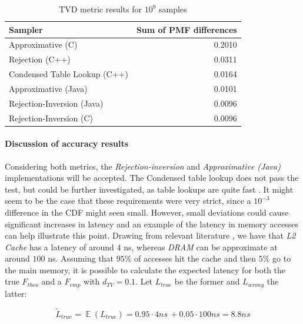\begin{table}[hbt]
    \centering
    \begin{tabular}{|l|r|}
        \hline
        \textbf{Sampler} & \textbf{Sum of PMF differences} \\
        \hline
        Approximative (C) & 0.2010\\
        \hline
        Rejection (C++) & 0.0311\\
        \hline
        Condensed Table Lookup (C++) & 0.0164 \\
        \hline
        Approximative (Java) & 0.0101\\
        \hline
        Rejection-Inversion (Java) & 0.0096\\
        \hline
        Rejection-Inversion (C) & 0.0096 \\
        \hline
    \end{tabular}
    \caption{TVD metric results for $10^9$ samples}\label{tab:tvd-results}
\end{table}

\paragraph{Discussion of accuracy results} Considering both metrics, the \textit{Rejection-inversion} and \textit{Approximative (Java)} implementations will be accepted. The Condensed 
table lookup does not pass the test, but could be further investigated, as table lookups are quite fast \cite{marsagliaFastGenerationDiscrete2004}. It might seem to be the case 
that these requirements were very strict, since a $10^{-3}$ difference in the CDF might seen small. However, small deviations could cause significant increases in latency and an example
of the latency in memory accesses can help illustrate this point. Drawing from relevant literature \cite{pattersonComputerOrganizationDesign2013,TeachYourselfProgramming},
we have that \textit{L2 Cache} has a latency of around $4$ ns, whereas \textit{DRAM} can be approximate at around $100$ ns. Assuming that $95\%$ of accesses hit the cache and then 
$5\%$ go to the main memory, it is possible to calculate the expected latency for both the true $F_{theo}$ and a $F_{emp}$ with $d_{TV} = 0.1$. Let $L_{true}$ be the former and $L_{wrong}$ 
the latter:
 
\begin{equation}
    \tilde{L}_{true} = \mathop{\mathbb{E}}(L_{true}) = 0.95 \cdot 4 ns \, + 0.05 \cdot 100 ns = 8.8ns
\end{equation}

